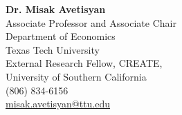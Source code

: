 \documentclass[11pt,letterpaper]{article}
\begin{document}
\vspace{14pt}

\noindent
\begin{minipage}[t]{0.48\textwidth}
\textbf{Dr. Misak Avetisyan}\\[3pt]
Associate Professor and Associate Chair\\
Department of Economics\\
Texas Tech University\\
External Research Fellow, CREATE,\\
University of Southern California\\
(806) 834-6156\\
\href{mailto:misak.avetisyan@ttu.edu}{misak.avetisyan@ttu.edu}
\end{minipage}
\end{document}
